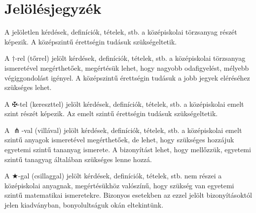 
\section*{Jelölésjegyzék}

A jelöletlen kérdések, definíciók, tételek, stb. a középiskolai törzsanyag
részét képezik. A középszintű érettségin tudásuk szükségeltetik.

A $\dagger$-rel (tőrrel) jelölt kérdések, definíciók, tételek, stb. a
középiskolai törzsanyag ismeretével megérthetőek, megértésük lehet, hogy
nagyobb odafigyelést, mélyebb végiggondolást igényel. A középszintű érettségin
tudásuk a jobb jegyek eléréséhez szükséges lehet.

A $\maltese$-tel (kereszttel) jelölt kérdések, definíciók, tételek, stb. a
középiskolai emelt szint részét képezik. Az emelt szintű érettségin tudásuk
szükségeltetik.

A $\pitchfork$-val (villával) jelölt kérdések, definíciók, tételek, stb. a
középiskolai emelt szintű anyagok ismeretével megérthetőek, de lehet, hogy
szükséges hozzájuk egyetemi szintű tananyag ismerete. A bizonyítást lehet, hogy
mellőzzük, egyetemi szintű tanagyag általában szükséges lenne hozzá.

A $\bigstar$-gal (csillaggal) jelölt kérdések, definíciók, tételek, stb. nem
részei a középiskolai anyagnak, megértésükhöz valószínű, hogy szükség van
egyetemi szintű matematikai ismeretekre. Bizonyos esetekben az ezzel jelölt
bizonyításoktól jelen kiadványban, bonyolultságuk okán eltekintünk.

